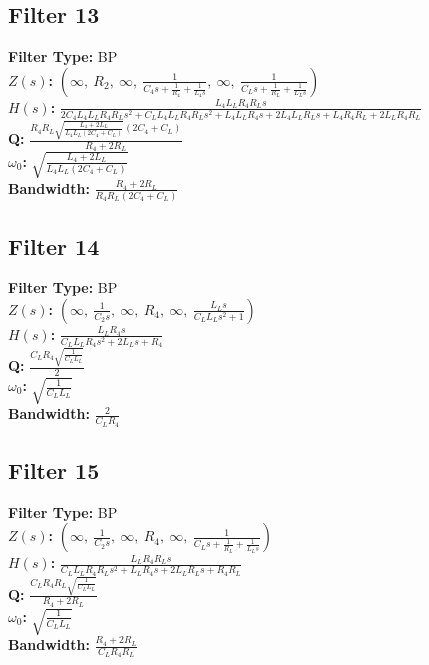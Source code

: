 \documentclass{article}
\begin{document}
\subsection*{Filter 13}
\textbf{Filter Type:} BP \\ 
\textbf{$Z(s)$:} $\left( \infty, \  R_{2}, \  \infty, \  \frac{1}{C_{4} s + \frac{1}{R_{4}} + \frac{1}{L_{4} s}}, \  \infty, \  \frac{1}{C_{L} s + \frac{1}{R_{L}} + \frac{1}{L_{L} s}}\right)$ \\ 
\textbf{$H(s)$:} $\frac{L_{4} L_{L} R_{4} R_{L} s}{2 C_{4} L_{4} L_{L} R_{4} R_{L} s^{2} + C_{L} L_{4} L_{L} R_{4} R_{L} s^{2} + L_{4} L_{L} R_{4} s + 2 L_{4} L_{L} R_{L} s + L_{4} R_{4} R_{L} + 2 L_{L} R_{4} R_{L}}$ \\ 
\textbf{Q:} $\frac{R_{4} R_{L} \sqrt{\frac{L_{4} + 2 L_{L}}{L_{4} L_{L} \left(2 C_{4} + C_{L}\right)}} \left(2 C_{4} + C_{L}\right)}{R_{4} + 2 R_{L}}$ \\ 
\textbf{$\omega_0$:} $\sqrt{\frac{L_{4} + 2 L_{L}}{L_{4} L_{L} \left(2 C_{4} + C_{L}\right)}}$ \\ 
\textbf{Bandwidth:} $\frac{R_{4} + 2 R_{L}}{R_{4} R_{L} \left(2 C_{4} + C_{L}\right)}$ \\ 
\subsection*{Filter 14}
\textbf{Filter Type:} BP \\ 
\textbf{$Z(s)$:} $\left( \infty, \  \frac{1}{C_{2} s}, \  \infty, \  R_{4}, \  \infty, \  \frac{L_{L} s}{C_{L} L_{L} s^{2} + 1}\right)$ \\ 
\textbf{$H(s)$:} $\frac{L_{L} R_{4} s}{C_{L} L_{L} R_{4} s^{2} + 2 L_{L} s + R_{4}}$ \\ 
\textbf{Q:} $\frac{C_{L} R_{4} \sqrt{\frac{1}{C_{L} L_{L}}}}{2}$ \\ 
\textbf{$\omega_0$:} $\sqrt{\frac{1}{C_{L} L_{L}}}$ \\ 
\textbf{Bandwidth:} $\frac{2}{C_{L} R_{4}}$ \\ 
\subsection*{Filter 15}
\textbf{Filter Type:} BP \\ 
\textbf{$Z(s)$:} $\left( \infty, \  \frac{1}{C_{2} s}, \  \infty, \  R_{4}, \  \infty, \  \frac{1}{C_{L} s + \frac{1}{R_{L}} + \frac{1}{L_{L} s}}\right)$ \\ 
\textbf{$H(s)$:} $\frac{L_{L} R_{4} R_{L} s}{C_{L} L_{L} R_{4} R_{L} s^{2} + L_{L} R_{4} s + 2 L_{L} R_{L} s + R_{4} R_{L}}$ \\ 
\textbf{Q:} $\frac{C_{L} R_{4} R_{L} \sqrt{\frac{1}{C_{L} L_{L}}}}{R_{4} + 2 R_{L}}$ \\ 
\textbf{$\omega_0$:} $\sqrt{\frac{1}{C_{L} L_{L}}}$ \\ 
\textbf{Bandwidth:} $\frac{R_{4} + 2 R_{L}}{C_{L} R_{4} R_{L}}$ \\ 
\end{document}
